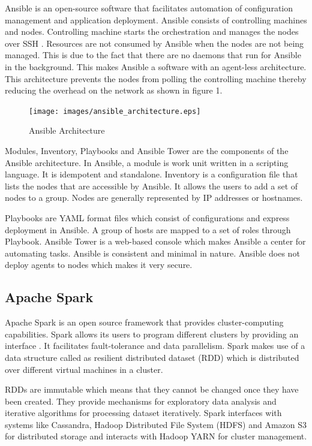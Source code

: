 \documentclass[9pt,twocolumn,twoside]{../../styles/osajnl}
\begin{document}
Ansible is an open-source software that facilitates automation of
configuration management and application deployment. Ansible consists
of controlling machines and nodes. Controlling machine starts the
orchestration and manages the nodes over SSH
\cite{ansibleWiki}. Resources are not consumed by Ansible when the
nodes are not being managed. This is due to the fact that there are no
daemons that run for Ansible in the background. This makes Ansible a
software with an agent-less architecture. This architecture prevents
the nodes from polling the controlling machine thereby reducing the
overhead on the network as shown in figure 1.

\begin{figure}[ht]
  \texttt{[image: images/ansible\_architecture.eps]}
  \caption{Ansible Architecture} \cite{ansibleArch}
\end{figure}

Modules, Inventory, Playbooks and Ansible Tower are the components of
the Ansible architecture. In Ansible, a module is work unit written in
a scripting language. It is idempotent and standalone. Inventory is a
configuration file that lists the nodes that are accessible by
Ansible. It allows the users to add a set of nodes to a group. Nodes
are generally represented by IP addresses or hostnames.

Playbooks are YAML format files which consist of configurations and
express deployment in Ansible. A group of hosts are mapped to a set of
roles through Playbook. Ansible Tower is a web-based console which
makes Ansible a center for automating tasks. Ansible is consistent and
minimal in nature. Ansible does not deploy agents to nodes which makes
it very secure.

\subsection{Apache Spark}

Apache Spark is an open source framework that provides
cluster-computing capabilities. Spark allows its users to program
different clusters by providing an interface \cite{sparkWiki}. It
facilitates fault-tolerance and data parallelism. Spark makes use of a
data structure called as resilient distributed dataset (RDD) which is
distributed over different virtual machines in a cluster.

RDDs are immutable which means that they cannot be changed once they
have been created. They provide mechanisms for exploratory data
analysis and iterative algorithms for processing dataset
iteratively. Spark interfaces with systems like Cassandra, Hadoop
Distributed File System (HDFS) and Amazon S3 for distributed storage
and interacts with Hadoop YARN for cluster management.
\end{document}
